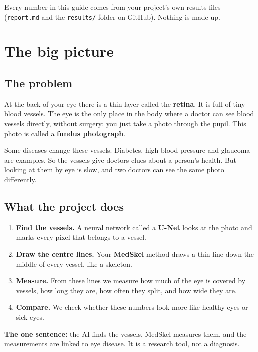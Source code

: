 \documentclass[11pt,a4paper]{article}
\begin{document}
Every number in this guide comes from your project's own results files (\texttt{report.md} and the \texttt{results/} folder on GitHub). Nothing is made up.

\tableofcontents
\newpage

\section{The big picture}

\subsection{The problem}
At the back of your eye there is a thin layer called the \textbf{retina}. It is full of tiny blood vessels. The eye is the only place in the body where a doctor can see blood vessels directly, without surgery: you just take a photo through the pupil. This photo is called a \textbf{fundus photograph}.

Some diseases change these vessels. Diabetes, high blood pressure and glaucoma are examples. So the vessels give doctors clues about a person's health. But looking at them by eye is slow, and two doctors can see the same photo differently.

\subsection{What the project does}
\begin{enumerate}
  \item \textbf{Find the vessels.} A neural network called a \textbf{U-Net} looks at the photo and marks every pixel that belongs to a vessel.
  \item \textbf{Draw the centre lines.} Your \textbf{MedSkel} method draws a thin line down the middle of every vessel, like a skeleton.
  \item \textbf{Measure.} From these lines we measure how much of the eye is covered by vessels, how long they are, how often they split, and how wide they are.
  \item \textbf{Compare.} We check whether these numbers look more like healthy eyes or sick eyes.
\end{enumerate}

\begin{remember}
\textbf{The one sentence:} the AI finds the vessels, MedSkel measures them, and the measurements are linked to eye disease. It is a research tool, not a diagnosis.
\end{remember}
\end{document}
